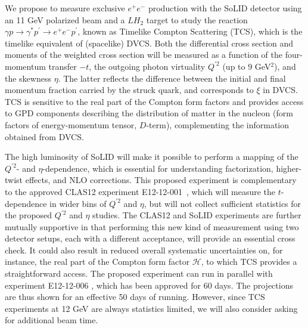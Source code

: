 We propose to measure exclusive $e^+e^-$ production with the SoLID detector
using an 11 GeV polarized beam and a $LH_2$ target to study the reaction
$\gamma p \to \gamma^* p^\prime \to e^+ e^- p^\prime$, known as Timelike
Compton Scattering (TCS), which is the timelike equivalent of (spacelike)
DVCS. Both the differential cross section and moments of the weighted cross
section will be measured as a function of the four-momentum transfer $-t$,
the outgoing photon virtuality $Q^{\prime 2}$ (up to 9 GeV$^2$), and the
skewness $\eta$. The latter reflects the difference between the initial
and final momentum fraction carried by the struck quark, and corresponds
to $\xi$ in DVCS.
TCS is sensitive to the real part of the Compton form factors and
provides access to GPD components describing the distribution of
matter in the nucleon (form factors of energy-momentum tensor,
$D$-term), complementing the information obtained from DVCS.

The high luminosity of SoLID will make it possible to perform a mapping
of the $Q^{\prime 2}$- and $\eta$-dependence, which is essential for
understanding factorization, higher-twist effects, and NLO corrections.
This proposed experiment is complementary to the approved CLAS12 experiment
E12-12-001~\cite{E12-12-001}, which will measure the $t$-dependence in
wider bins of $Q^{\prime 2}$ and $\eta$, but will not collect sufficient
statistics for the proposed $Q^{\prime 2}$ and $\eta$ studies.
The CLAS12 and SoLID experiments are further mutually supportive in
that performing this new kind of measurement using two detector setups,
each with a different acceptance, will provide an essential cross check.
It could also result in reduced overall systematic uncertainties on,
for instance, the real part of the Compton form factor $\mathcal{H}$,
to which TCS provides a straightforward access.
The proposed experiment can run in parallel with experiment E12-12-006
\cite{E12-12-006}, which has been approved for 60 days. The projections
are thus shown for an effective 50 days of running. However, since TCS
experiments at 12 GeV are always statistics limited, we will also
consider asking for additional beam time.
